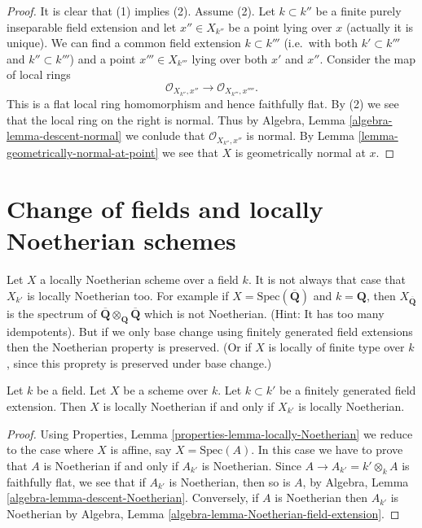 \begin{proof}
It is clear that (1) implies (2). Assume (2).
Let $k \subset k''$ be a finite purely inseparable field extension
and let $x'' \in X_{k''}$ be a point lying over $x$ (actually it is
unique). We can find a common field extension $k \subset k'''$
(i.e.\ with both $k' \subset k'''$ and $k'' \subset k'''$) and a point
$x''' \in X_{k'''}$ lying over both $x'$ and $x''$.
Consider the map of local rings
$$
\mathcal{O}_{X_{k''}, x''} \longrightarrow \mathcal{O}_{X_{k'''}, x''''}.
$$
This is a flat local ring homomorphism and hence faithfully flat.
By (2) we see that the local ring on the right is normal.
Thus by Algebra, Lemma \ref{algebra-lemma-descent-normal}
we conlude that $\mathcal{O}_{X_{k''}, x''}$ is normal.
By Lemma \ref{lemma-geometrically-normal-at-point} we see that $X$
is geometrically normal at $x$.
\end{proof}










\section{Change of fields and locally Noetherian schemes}
\label{section-locally-Noetherian}

\noindent
Let $X$ a locally Noetherian scheme over a field $k$.
It is not always that case that $X_{k'}$ is locally Noetherian too.
For example if $X = \text{Spec}(\overline{\mathbf{Q}})$ and
$k = \mathbf{Q}$, then $X_{\overline{\mathbf{Q}}}$ is the spectrum
of $\overline{\mathbf{Q}} \otimes_{\mathbf{Q}} \overline{\mathbf{Q}}$
which is not Noetherian. (Hint: It has too many idempotents).
But if we only base change using finitely generated field extensions
then the Noetherian property is preserved. (Or if $X$ is locally of finite
type over $k$, since this proprety is preserved under base change.)

\begin{lemma}
\label{lemma-locally-Noetherian-base-change}
Let $k$ be a field.
Let $X$ be a scheme over $k$.
Let $k \subset k'$ be a finitely generated field extension.
Then $X$ is locally Noetherian if and only if $X_{k'}$ is locally
Noetherian.
\end{lemma}

\begin{proof}
Using Properties, Lemma \ref{properties-lemma-locally-Noetherian}
we reduce to the case where $X$ is
affine, say $X = \text{Spec}(A)$. In this case we have to prove that
$A$ is Noetherian if and only if $A_{k'}$ is Noetherian.
Since $A \to A_{k'} = k' \otimes_k A$ is faithfully flat, we see
that if $A_{k'}$ is Noetherian, then so is $A$, by
Algebra, Lemma \ref{algebra-lemma-descent-Noetherian}.
Conversely, if $A$ is Noetherian then $A_{k'}$ is Noetherian by
Algebra, Lemma \ref{algebra-lemma-Noetherian-field-extension}.
\end{proof}







